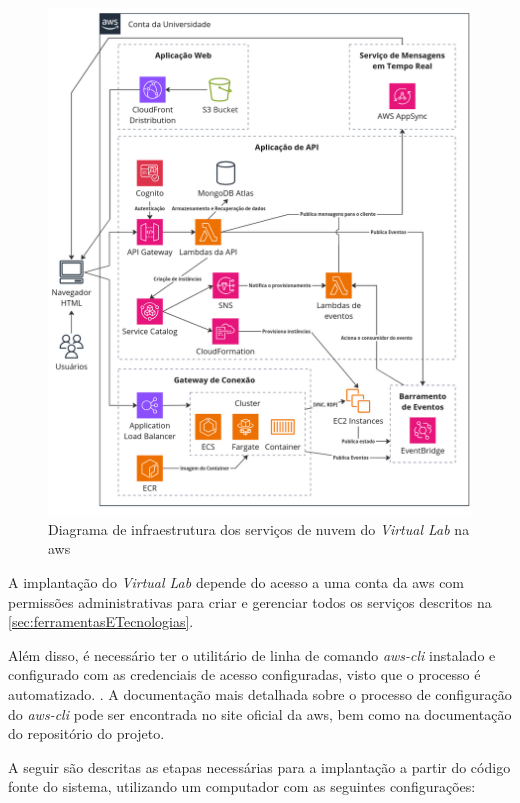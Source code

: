 \begin{figure}[H]
\caption{Diagrama de infraestrutura dos serviços de nuvem do \textit{Virtual Lab} na \gls{aws}}
\label{fig:diagramaDeinfraestruturaAws}
\includegraphics[width=\textwidth]{capitulos/2-metodologia/files/infra-diagram.png}
\end{figure}

A implantação do \textit{Virtual Lab} depende do acesso a uma conta da \gls{aws} com permissões administrativas para criar e gerenciar todos os serviços descritos na \autoref{sec:ferramentasETecnologias}. 

Além disso, é necessário ter o utilitário de linha de comando \textit{aws-cli} instalado e configurado com as credenciais de acesso configuradas, visto que o processo é automatizado. \citep{awsclidocs}. A documentação mais detalhada sobre o processo de configuração do \textit{aws-cli} pode ser encontrada no site oficial da \gls{aws}, bem como na documentação do repositório do projeto.

A seguir são descritas as etapas necessárias para a implantação a partir do código fonte do sistema, utilizando um computador com as seguintes configurações:

